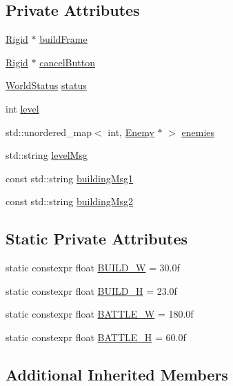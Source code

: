 \subsection*{Private Attributes}
\begin{DoxyCompactItemize}
\item 
\hyperlink{classRigid}{Rigid} $\ast$ \hyperlink{classMainWorld_a10e4e51760423fa95cc57f4f5f8f5b76}{build\+Frame}
\item 
\hyperlink{classRigid}{Rigid} $\ast$ \hyperlink{classMainWorld_a44391b2d794f460d9e9898716f7c00e8}{cancel\+Button}
\item 
\hyperlink{classMainWorld_ab0b1d1d54026f907ddc7fcc858ea48f3}{World\+Status} \hyperlink{classMainWorld_a9769c3d0399e2d8a8176c0c21762b1eb}{status}
\item 
int \hyperlink{classMainWorld_a858b57e7a6e32e4f771c66b87cfac1d7}{level}
\item 
std\+::unordered\+\_\+map$<$ int, \hyperlink{classEnemy}{Enemy} $\ast$ $>$ \hyperlink{classMainWorld_a47830d0b4f72482d07985b94b982f4b3}{enemies}
\item 
std\+::string \hyperlink{classMainWorld_a0d1545c344c83a85d56597b8e582a6db}{level\+Msg}
\item 
const std\+::string \hyperlink{classMainWorld_a12fc771468255ea67138459b8f80bb95}{building\+Msg1}
\item 
const std\+::string \hyperlink{classMainWorld_ac33f26e815fc9f69e5119843dfc2b987}{building\+Msg2}
\end{DoxyCompactItemize}
\subsection*{Static Private Attributes}
\begin{DoxyCompactItemize}
\item 
static constexpr float \hyperlink{classMainWorld_a92c8b34eec78a999312c4b1d982d5f0c}{B\+U\+I\+L\+D\+\_\+\+W} = 30.\+0f
\item 
static constexpr float \hyperlink{classMainWorld_abb38bf72b8a3c5ff6df3a43c7ebfba25}{B\+U\+I\+L\+D\+\_\+\+H} = 23.\+0f
\item 
static constexpr float \hyperlink{classMainWorld_a58ef88e1b0a8c840090a44ceb9917f8a}{B\+A\+T\+T\+L\+E\+\_\+\+W} = 180.\+0f
\item 
static constexpr float \hyperlink{classMainWorld_aa2bb1e5ed0ea5b97b36addf18ec1b37c}{B\+A\+T\+T\+L\+E\+\_\+\+H} = 60.\+0f
\end{DoxyCompactItemize}
\subsection*{Additional Inherited Members}


